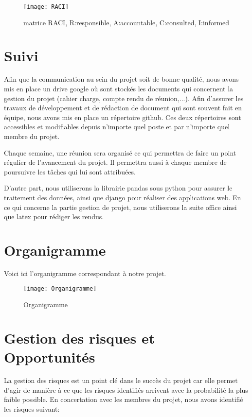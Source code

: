\begin{figure}[!h]
	\centering
	\texttt{[image: RACI]}
	\caption{matrice RACI, R:responsible, A:accountable, C:consulted, I:informed}
	\label{fig:raci}
\end{figure}
\section*{Suivi}
Afin que la communication au sein du projet soit de bonne qualité, nous avons mis en place un drive google où sont stockés les documents qui concernent la gestion du projet (cahier charge, compte rendu de réunion,...). Afin d'assurer les travaux de développement et de rédaction de document qui sont souvent fait en équipe, nous avons mis en place un répertoire github. Ces deux répertoires sont accessibles et modifiables depuis n'importe quel poste et par n'importe quel membre du projet. 

Chaque semaine, une réunion sera organisé ce qui permettra de faire un point régulier de l'avancement du projet. Il permettra aussi à chaque membre de poursuivre les tâches qui lui sont attribuées.

D'autre part, nous utiliserons la librairie pandas sous python pour assurer le traitement des données, ainsi que django pour réaliser des applications web. En ce qui concerne la partie gestion de projet, nous utiliserons la suite office ainsi que latex pour rédiger les rendus.

\section*{Organigramme}
Voici ici l'organigramme correspondant à notre projet.
\begin{figure}[!ht]
	\centering
	\texttt{[image: Organigramme]}
	\caption{Organigramme}
	\label{fig:Organigramme}
\end{figure}



\section*{Gestion des risques et Opportunités}
La gestion des risques est un point clé dans le succès du projet car elle permet d'agir de manière à ce que les risques identifiés arrivent avec la probabilité la plus faible possible. En concertation avec les membres du projet, nous avons identifié les risques suivant:

